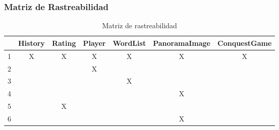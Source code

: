 \subsubsection{Matriz de Rastreabilidad}

\begin{table}[H]
    \centering
	\begin{tabular}{| c | c | c | c | c | c | c |}       
		\hline 
		& History & Rating & Player & WordList & PanoramaImage & ConquestGame\\
		\hline
		1 & X & X & X & X & X & X \\
		\hline
		2 &  & & X &  &  &  \\
		\hline
		3 &  &  &  & X &  &  \\
		\hline
		4 &  &  &  &  & X &  \\
		\hline
		5 &  & X &  &  &  &  \\
		\hline
		6 &  &  &  &  & X &  \\
		\hline
	\end{tabular}
	\caption{Matriz de rastreabilidad}
\end{table}